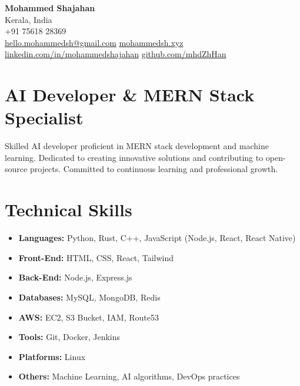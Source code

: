 \documentclass[a4paper,10pt]{article}
\begin{document}
\begin{center}
    \Large \textbf{Mohammed Shajahan}\\
    \vspace{1mm}
    \normalsize
    Kerala, India \\
    +91 75618 28369 \\
    \faEnvelope \href{mailto:hello.mohammedsh@gmail.com}{hello.mohammedsh@gmail.com} \hspace{10pt}
    \faGlobe \href{https://mohammedsh.xyz}{mohammedsh.xyz} \hspace{10pt}
    \faLinkedinSquare \href{https://www.linkedin.com/in/mohammedshajahan}{linkedin.com/in/mohammedshajahan} \hspace{10pt}
    \faGithub \href{https://github.com/mhdZhHan}{github.com/mhdZhHan} \\
\end{center}

\vspace{1mm}

\section*{AI Developer \& MERN Stack Specialist}
Skilled AI developer proficient in MERN stack development and machine learning. Dedicated to creating innovative solutions and contributing to open-source projects. Committed to continuous learning and professional growth.

\section*{Technical Skills}
\begin{multicols}{2}
\begin{itemize}[leftmargin=0.15in]
    \item \textbf{Languages:} Python, Rust, C++, JavaScript (Node.js, React, React Native)
    \item \textbf{Front-End:} HTML, CSS, React, Tailwind
    \item \textbf{Back-End:} Node.js, Express.js
    \item \textbf{Databases:} MySQL, MongoDB, Redis
    \item \textbf{AWS:} EC2, S3 Bucket, IAM, Route53
    \item \textbf{Tools:} Git, Docker, Jenkins
    \item \textbf{Platforms:} Linux
    \item \textbf{Others:} Machine Learning, AI algorithms, DevOps practices
\end{itemize}
\end{multicols}
\end{document}
